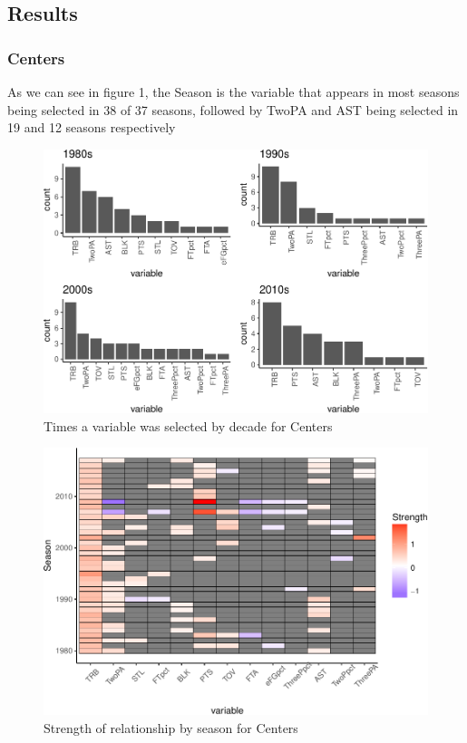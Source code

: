 \documentclass[]{elsarticle} %
\makeatletter
\def\maxwidth{\ifdim\Gin@nat@width>\linewidth\linewidth
\else\Gin@nat@width\fi}
\let\Oldincludegraphics\includegraphics
\renewcommand{\includegraphics}[1]{\Oldincludegraphics[width=\maxwidth]{#1}}
\makeatother
\begin{document}
\subsection{Results}\label{results}

\subsubsection{Centers}\label{centers}

As we can see in figure 1, the Season is the variable that appears in
most seasons being selected in 38 of 37 seasons, followed by TwoPA and
AST being selected in 19 and 12 seasons respectively

\begin{figure}[htbp]
\centering
\includegraphics{Coaching_Selection_files/figure-latex/unnamed-chunk-6-1.pdf}
\caption{Times a variable was selected by decade for Centers}
\end{figure}

\begin{figure}[htbp]
\centering
\includegraphics{Coaching_Selection_files/figure-latex/unnamed-chunk-7-1.pdf}
\caption{Strength of relationship by season for Centers}
\end{figure}
\end{document}
